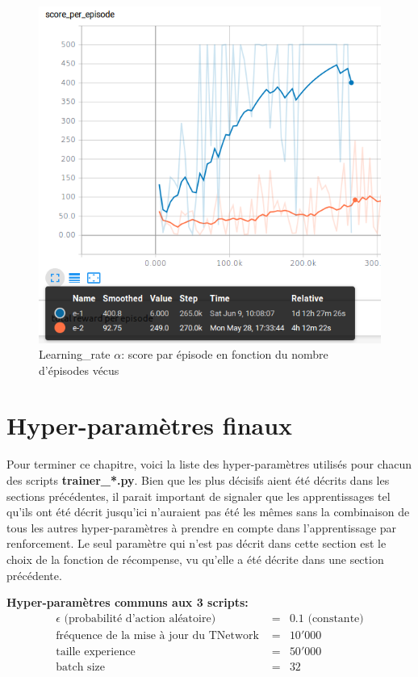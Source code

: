 \documentclass[11pt,a4paper]{report}
\begin{document}
   \begin{figure}[!h]
   \center
   \includegraphics[scale=0.5]{ressources/learning_rate_graph.png}
   \caption{Learning\_rate $\alpha$: score par épisode en fonction du nombre d'épisodes vécus}
   \end{figure} 
   
  \newpage
  \section{Hyper-paramètres finaux}
  
  \par Pour terminer ce chapitre, voici la liste des hyper-paramètres utilisés pour chacun des scripts \textbf{trainer\_*.py}. Bien que les plus décisifs aient été décrits dans les sections précédentes, il parait important de signaler que les apprentissages tel qu'ils ont été décrit jusqu'ici n'auraient pas été les mêmes sans la combinaison de tous les autres hyper-paramètres à prendre en compte dans l'apprentissage par renforcement. Le seul paramètre qui n'est pas décrit dans cette section est le choix de la fonction de récompense, vu qu'elle a été décrite dans une section précédente. 
  
   \textbf{Hyper-paramètres communs aux 3 scripts:}   
   \begin{eqnarray}
   \epsilon \text{ (probabilité d'action aléatoire) } &=& 0.1 \text{ (constante)} \\
   \text{fréquence de la mise à jour du TNetwork } &=& 10'000 \\
   \text{taille experience } &=& 50'000 \\
   \text{batch size } &=& 32 
   \end{eqnarray}
\end{document}
